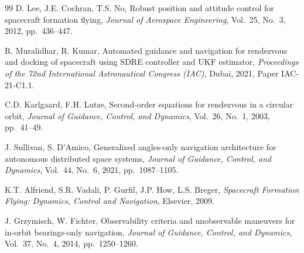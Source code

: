 \documentclass[preprint,3p,times]{elsarticle}
\begin{document}
\begin{thebibliography}{99}
D. Lee, J.E. Cochran, T.S. No,
\newblock Robust position and attitude control for spacecraft formation flying,
\newblock \emph{Journal of Aerospace Engineering}, Vol.~25, No.~3, 2012, pp.~436--447.

R. Muralidhar, R. Kumar,
\newblock Automated guidance and navigation for rendezvous and docking of spacecraft using SDRE controller and UKF estimator,
\newblock \emph{Proceedings of the 72nd International Astronautical Congress (IAC)}, Dubai, 2021, Paper IAC-21-C1.1.

C.D. Karlgaard, F.H. Lutze,
\newblock Second-order equations for rendezvous in a circular orbit,
\newblock \emph{Journal of Guidance, Control, and Dynamics}, Vol.~26, No.~1, 2003, pp.~41--49.

J. Sullivan, S. D'Amico,
\newblock Generalized angles-only navigation architecture for autonomous distributed space systems,
\newblock \emph{Journal of Guidance, Control, and Dynamics}, Vol.~44, No.~6, 2021, pp.~1087--1105.

K.T. Alfriend, S.R. Vadali, P. Gurfil, J.P. How, L.S. Breger,
\newblock \emph{Spacecraft Formation Flying: Dynamics, Control and Navigation},
\newblock Elsevier, 2009.

J. Grzymisch, W. Fichter,
\newblock Observability criteria and unobservable maneuvers for in-orbit bearings-only navigation,
\newblock \emph{Journal of Guidance, Control, and Dynamics}, Vol.~37, No.~4, 2014, pp.~1250--1260.

\end{thebibliography}
\end{document}
